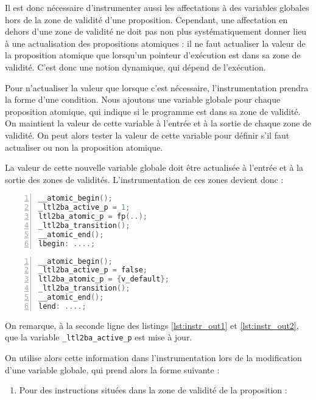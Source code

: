 Il est donc nécessaire d'instrumenter aussi les affectations à des
variables globales hors de la zone de validité d'une proposition.
Cependant, une affectation en dehors d'une zone de validité ne doit pas
non plus systématiquement donner lieu à une actualisation des
propositions atomiques : il ne faut actualiser la valeur de la proposition
atomique que lorsqu'un pointeur d'exécution est dans sa zone de
validité. C'est donc une notion dynamique, qui dépend de l'exécution.

Pour n'actualiser la valeur que lorsque c'est nécessaire,
l'instrumentation prendra la forme d'une condition. Nous ajoutons une
variable globale pour chaque proposition atomique, qui indique si le
programme est dans sa zone de validité. On maintient la valeur de cette
variable à l'entrée et à la sortie de chaque zone de validité. On peut
alors tester la valeur de cette variable pour définir s’il faut
actualiser ou non la proposition atomique.

La valeur de cette nouvelle variable globale doit être actualisée à
l'entrée et à la sortie des zones de validités. L'instrumentation de ces
zones devient donc :

\noindent\begin{minipage}{.47\textwidth}
  \begin{lstlisting}[language=C, frame=single, numbers=left,
    caption=Entrée d'une zone de validité (2), label=lst:instr_in2]
__atomic_begin();
_ltl2ba_active_p = 1;
ltl2ba_atomic_p = fp(..);
_ltl2ba_transition();
__atomic_end();
lbegin: ....;
\end{lstlisting}
\end{minipage}\hfill
\begin{minipage}{.47\textwidth}
  \begin{lstlisting}[language=C, frame=single, numbers=left,
    caption=Sortie d'une zone de validité (2), label=lst:instr_out2]
__atomic_begin();
_ltl2ba_active_p = false;
ltl2ba_atomic_p = {v_default};
_ltl2ba_transition();
__atomic_end();
lend: ....;
\end{lstlisting}
\end{minipage}

On remarque, à la seconde ligne des listings \ref{lst:instr_out1} et
\ref{lst:instr_out2}, que la variable \texttt{\_ltl2ba\_active\_p} est mise
à jour.

On utilise alors cette information dans l'instrumentation lors de la
modification d'une variable globale, qui prend alors la forme suivante :

\begin{enumerate}
\def\labelenumi{\arabic{enumi})}
\item
  Pour des instructions situées dans la zone de validité de la
  proposition :
\end{enumerate}


